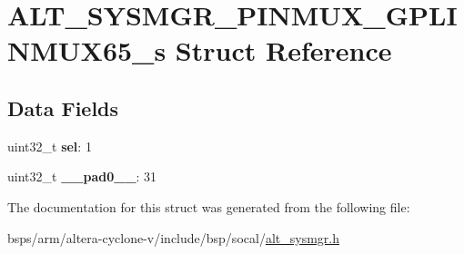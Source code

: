 \hypertarget{structALT__SYSMGR__PINMUX__GPLINMUX65__s}{}\section{A\+L\+T\+\_\+\+S\+Y\+S\+M\+G\+R\+\_\+\+P\+I\+N\+M\+U\+X\+\_\+\+G\+P\+L\+I\+N\+M\+U\+X65\+\_\+s Struct Reference}
\label{structALT__SYSMGR__PINMUX__GPLINMUX65__s}
\subsection*{Data Fields}
\begin{DoxyCompactItemize}
\item 
\mbox{\label{structALT__SYSMGR__PINMUX__GPLINMUX65__s_a3a7db1d94cf658df80971a58aba5dd19}} 
uint32\+\_\+t {\bfseries sel}\+: 1
\item 
\mbox{\label{structALT__SYSMGR__PINMUX__GPLINMUX65__s_a2ca97572501ff404bdc084430fc32f69}} 
uint32\+\_\+t {\bfseries \+\_\+\+\_\+pad0\+\_\+\+\_\+}\+: 31
\end{DoxyCompactItemize}


The documentation for this struct was generated from the following file\+:\begin{DoxyCompactItemize}
\item 
bsps/arm/altera-\/cyclone-\/v/include/bsp/socal/\mbox{\hyperlink{alt__sysmgr_8h}{alt\+\_\+sysmgr.\+h}}\end{DoxyCompactItemize}

